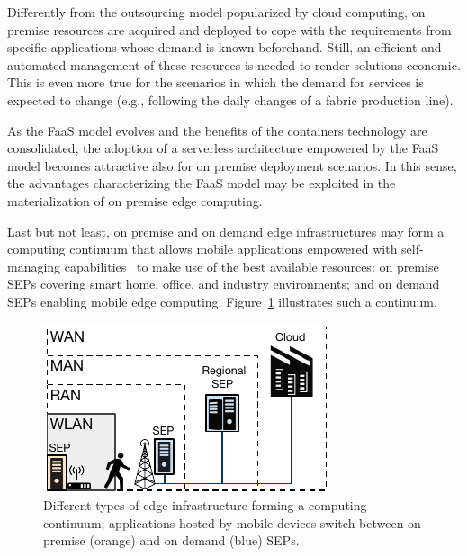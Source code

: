 Differently from the outsourcing model popularized by cloud computing, on premise resources are acquired and deployed to cope with the requirements from specific applications whose demand is known beforehand. Still, an efficient and automated management of these resources is needed to render solutions economic. This is even more true for the scenarios in which the demand for services is expected to change (e.g., following the daily changes of a fabric production line). 


As the FaaS model evolves and the benefits of the containers technology are consolidated, the adoption of a serverless architecture empowered by the FaaS model becomes attractive also for on premise deployment scenarios. In this sense, the advantages characterizing the FaaS model may be exploited in the materialization of on premise edge computing.

Last but not least, on premise and on demand edge infrastructures may form a computing continuum that allows mobile applications empowered with self-managing capabilities~\cite{Baresi:2018} to make use of the best available resources: on premise SEPs covering smart home, office, and industry environments; and on demand SEPs enabling mobile edge computing. Figure~\ref{fig:Edge_Cloud_Continuum} illustrates such a continuum.

\begin{figure}[b]
	\centering
	\includegraphics[width=0.95\linewidth]{Figs/Edge_Cloud_Continuum}
	\caption{Different types of edge infrastructure forming a computing continuum; applications hosted by mobile devices switch between on premise (orange) and on demand (blue) SEPs.}
	\label{fig:Edge_Cloud_Continuum}
\end{figure}

